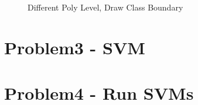 \documentclass[12pt]{article}
\begin{document}
\begin{enumerate}
    \begin{figure}[H]
        \centering
        \caption{Different Poly Level, Draw Class Boundary}
        \label{Fig.lable}
    \end{figure}

\end{enumerate}


\section{Problem3 - SVM}


\section{Problem4 - Run SVMs}
\end{document}
